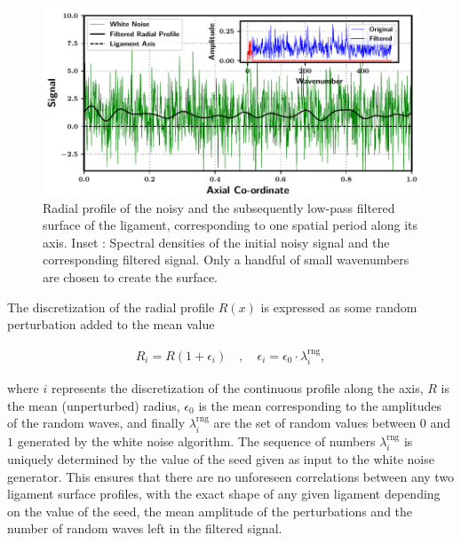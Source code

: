 \begin{figure}
\centering
\includegraphics{plots/ligament_breakup/profile.pdf}
	\caption{ Radial profile of the noisy and the subsequently 
	low-pass filtered surface of the ligament, corresponding to 
	one spatial period along its axis. 
	Inset : Spectral densities of the initial noisy signal
        and the corresponding filtered signal. Only a handful
	of small wavenumbers are chosen to create the surface. 
}
\label{surface}
\end{figure}

The discretization of the radial profile $R(x)$ is expressed
as some random perturbation added to the mean value   

\begin{align}
R_i = R \left( 1 + \epsilon_i \right) \quad , \quad \epsilon _i = \epsilon_0 \cdot \lambda_i^{\textrm{rng}}, 
\end{align}

where $i$ represents the discretization of the continuous profile along the
axis, $R$ is the mean (unperturbed) radius, 
$\epsilon_0$ is the mean corresponding to the amplitudes
of the random waves, and finally $\lambda_i^{\textrm{rng}}$ are the set of  
random values between $0$ and $1$ generated by the white noise algorithm.
The sequence of numbers $\lambda_i^{\textrm{rng}}$ is uniquely determined 
by the value of the seed given as input to the white noise generator.
This ensures that there are no unforeseen correlations between any two
ligament surface profiles, with the exact shape of any given ligament  
depending on the value of the seed, the mean amplitude  
of the perturbations and the number of random waves left in the filtered signal. 


